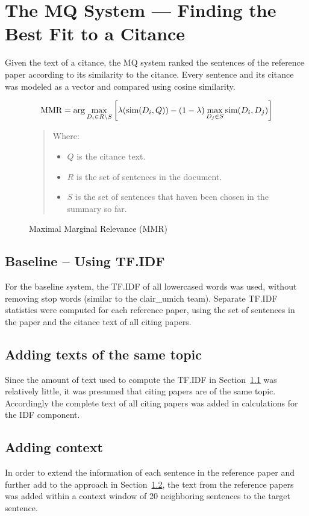 \documentclass[11pt]{article}
\begin{document}

\section{The MQ System --- Finding the Best Fit to a Citance}
\label{s:mq}
Given the text of a citance, the MQ system ranked the sentences of the reference paper according to its similarity to the citance. Every sentence and its citance was modeled as a vector and compared using cosine similarity. 

\begin{figure*}
$$
\hbox{MMR} = \arg\max_{D_i\in R\setminus S}\left[\lambda(\hbox{sim}(D_i,Q)) -
(1-\lambda) \max_{D_j\in S} \hbox{sim}(D_i,D_j)\right]
$$  
\begin{quote}
Where:
\begin{itemize}
\item $Q$ is the citance text.
\item $R$ is the set of sentences in the document.
\item $S$ is the set of sentences that haven been chosen in the
  summary so far.  
\end{itemize}
\end{quote}
  \caption{Maximal Marginal Relevance (MMR)}
  \label{fig:mmr}
\end{figure*}

\subsection{Baseline -- Using TF.IDF}
\label{sec:tfidf}
For the baseline system, the TF.IDF of all lowercased words was used, without removing stop words (similar to the clair\_umich team). Separate TF.IDF statistics were computed for each reference paper, using the set of sentences in the paper and the citance text of all citing papers.

\subsection{Adding texts of the same topic}
\label{sec:topics}
Since the amount of text used to compute the TF.IDF in Section~\ref{sec:tfidf} was relatively little, it was presumed that citing papers are of the same topic. Accordingly the complete text of all citing papers was added in calculations for the IDF component.

\subsection{Adding context}
\label{sec:context}
In order to  extend the information of each sentence in the reference paper and further add to the approach in Section~\ref{sec:topics}, the text from the reference papers was added within a context window of 20 neighboring sentences to the target sentence. 
\end{document}
